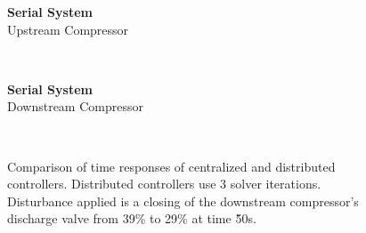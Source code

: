 \ifmakeplots
\begin{figure}
  {\centering\large\textbf{Serial System}\\ Upstream Compressor\\[1em]}
  \begin{subfigure}{0.48\linewidth}
    \footnotesize
    
    \normalsize
    \caption{}
    \label{fig:res:serial-timeresp:p1}
  \end{subfigure}
  \hfill
  \begin{subfigure}{0.48\linewidth}
    \footnotesize
    
    \normalsize
    \caption{}
    \label{fig:res:serial-timeresp:sd1}
  \end{subfigure}
  \\
  \begin{subfigure}{0.48\linewidth}
    \footnotesize
    
    \normalsize
    \caption{}
    \label{fig:res:serial-timeresp:td1}
  \end{subfigure}
  \hfill
  \begin{subfigure}{0.48\linewidth}
    \footnotesize
    
    \normalsize
    \caption{}
    \label{fig:res:serial-timeresp:ur1}
  \end{subfigure}
\end{figure}

\begin{figure}
  \ContinuedFloat
  {\centering\large\textbf{Serial System}\\ Downstream Compressor\\[1em]}
  \begin{subfigure}{0.48\linewidth}
    \centering
    \footnotesize
    
    \normalsize
    \caption{}
    \label{fig:res:serial-timeresp:p2}
  \end{subfigure}
  \hfill
  \begin{subfigure}{0.48\linewidth}
    \centering
    \footnotesize
    
    \normalsize
    \caption{}
    \label{fig:res:serial-timeresp:sd2}
  \end{subfigure}
  \\
  \begin{subfigure}{0.48\linewidth}
    \centering
    \footnotesize
    
    \normalsize
    \caption{}
    \label{fig:res:serial-timeresp:td2}
  \end{subfigure}
  \hfill
  \begin{subfigure}{0.48\linewidth}
    \centering
    \footnotesize
    
    \normalsize
    \caption{}
    \label{fig:res:serial-timeresp:ur2}
  \end{subfigure}

  \caption[Time response of serial system.]{Comparison of time responses of centralized and distributed controllers. Distributed controllers use 3 solver iterations. Disturbance applied is a closing of the downstream compressor's discharge valve from 39\% to 29\% at time \u{50}{s}.}
  \label{fig:res:serial-timeresp}
\end{figure}

